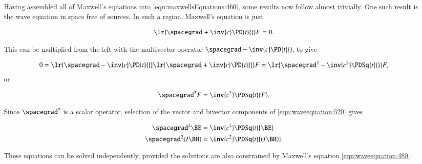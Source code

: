 %
%
Having assembled all of Maxwell's equations into \cref{eqn:maxwellsEquations:460}, some results now follow almost trivially.
One such result is the wave equation in space free of sources.
In such a region, Maxwell's equation is just

\begin{dmath}\label{eqn:waveequation:480}
\lr{ \spacegrad + \inv{c} \PD{t}{} } F = 0.
\end{dmath}

This can be multiplied from the left with the multivector operator \( \spacegrad - \inv{c} \PD{t}{} \), to give

\begin{dmath}\label{eqn:waveequation:500}
0 =
\lr{ \spacegrad - \inv{c} \PD{t}{} }
\lr{ \spacegrad + \inv{c} \PD{t}{} } F
=
\lr{ \spacegrad^2 - \inv{c^2} \PDSq{t}{} } F,
\end{dmath}
or

\begin{dmath}\label{eqn:waveequation:520}
\spacegrad^2 F = \inv{c^2} \PDSq{t}{F}.
\end{dmath}

Since \( \spacegrad^2 \) is a scalar operator, selection of the vector and bivector components of \cref{eqn:waveequation:520} gives

\begin{dmath}\label{eqn:waveequation:540}
\begin{aligned}
\spacegrad^2 \BE &= \inv{c^2} \PDSq{t}{\BE} \\
\spacegrad^2 (I \BH) &= \inv{c^2} \PDSq{t}{(I \BH)}.
\end{aligned}
\end{dmath}

These equations can be solved independently, provided the solutions are also constrained by Maxwell's equation \cref{eqn:waveequation:480}.

